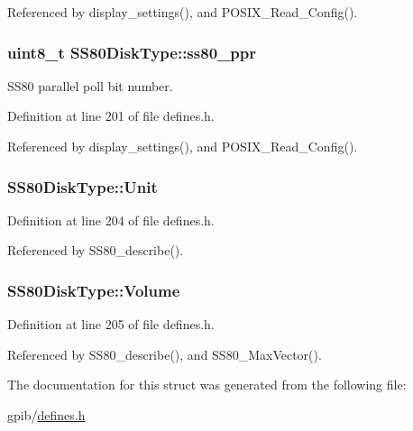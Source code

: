 Referenced by display\+\_\+settings(), and P\+O\+S\+I\+X\+\_\+\+Read\+\_\+\+Config().

\subsubsection[{\texorpdfstring{ss80\+\_\+ppr}{ss80_ppr}}]{\setlength{\rightskip}{0pt plus 5cm}uint8\+\_\+t S\+S80\+Disk\+Type\+::ss80\+\_\+ppr}\hypertarget{structSS80DiskType_a93cbe7ea84a0d2d33ecc4eaae8367bd5}{}\label{structSS80DiskType_a93cbe7ea84a0d2d33ecc4eaae8367bd5}


S\+S80 parallel poll bit number. 



Definition at line 201 of file defines.\+h.



Referenced by display\+\_\+settings(), and P\+O\+S\+I\+X\+\_\+\+Read\+\_\+\+Config().

\subsubsection[{\texorpdfstring{Unit}{Unit}}]{ S\+S80\+Disk\+Type\+::\+Unit}\hypertarget{structSS80DiskType_a53779c62a77383b446ab9097ed70481d}{}\label{structSS80DiskType_a53779c62a77383b446ab9097ed70481d}


Definition at line 204 of file defines.\+h.



Referenced by S\+S80\+\_\+describe().

\subsubsection[{\texorpdfstring{Volume}{Volume}}]{ S\+S80\+Disk\+Type\+::\+Volume}\hypertarget{structSS80DiskType_a34eaa5702599d69fcd7c2fc7e13a2256}{}\label{structSS80DiskType_a34eaa5702599d69fcd7c2fc7e13a2256}


Definition at line 205 of file defines.\+h.



Referenced by S\+S80\+\_\+describe(), and S\+S80\+\_\+\+Max\+Vector().



The documentation for this struct was generated from the following file\+:\begin{DoxyCompactItemize}
\item 
gpib/\hyperlink{defines_8h}{defines.\+h}\end{DoxyCompactItemize}
